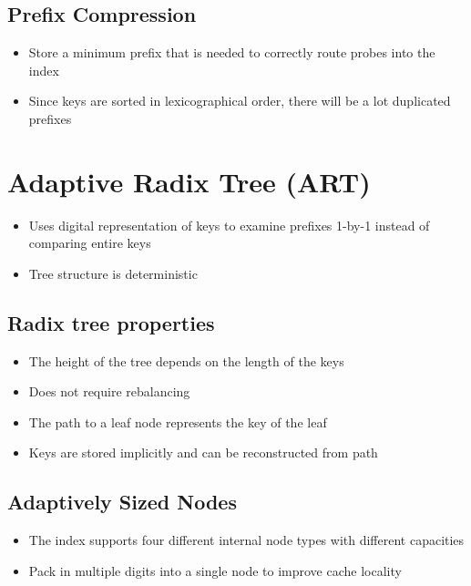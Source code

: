 \documentclass[11pt]{article}
\begin{document}
    \subsection*{Prefix Compression}
        \begin{itemize}
            \item Store a minimum prefix that is needed to correctly route probes into the index
            \item Since keys are sorted in lexicographical order, there will be a lot duplicated prefixes
        \end{itemize}



\section{Adaptive Radix Tree (ART)~\cite{leis-icde2013}}
    \begin{itemize}
        \item Uses digital representation of keys to examine prefixes 1-by-1 instead of comparing entire keys
        \item Tree structure is deterministic
    \end{itemize}

\subsection*{Radix tree properties}
    \begin{itemize}
        \item The height of the tree depends on the length of the keys
        \item Does not require rebalancing
        \item The path to a leaf node represents the key of the leaf
        \item Keys are stored implicitly and can be reconstructed from path
    \end{itemize}
\subsection*{Adaptively Sized Nodes}
    \begin{itemize}
        \item The index supports four different internal node types with different capacities
        \item Pack in multiple digits into a single node to improve cache locality
    \end{itemize}
\end{document}
